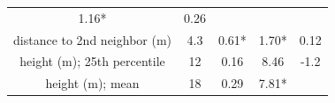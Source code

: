 \documentclass[]{article}
\begin{document}
\begin{longtable}[]{@{}ccccc@{}}
\begin{minipage}[t]{0.08\columnwidth}
1.16*\strut
\end{minipage} & \begin{minipage}[t]{0.13\columnwidth}\centering\strut
0.26\strut
\end{minipage}\tabularnewline
\begin{minipage}[t]{0.28\columnwidth}\centering\strut
distance to 2nd neighbor (m)\strut
\end{minipage} & \begin{minipage}[t]{0.13\columnwidth}\centering\strut
4.3\strut
\end{minipage} & \begin{minipage}[t]{0.24\columnwidth}\centering\strut
0.61*\strut
\end{minipage} & \begin{minipage}[t]{0.08\columnwidth}\centering\strut
1.70*\strut
\end{minipage} & \begin{minipage}[t]{0.13\columnwidth}\centering\strut
0.12\strut
\end{minipage}\tabularnewline
\begin{minipage}[t]{0.28\columnwidth}\centering\strut
height (m); 25th percentile\strut
\end{minipage} & \begin{minipage}[t]{0.13\columnwidth}\centering\strut
12\strut
\end{minipage} & \begin{minipage}[t]{0.24\columnwidth}\centering\strut
0.16\strut
\end{minipage} & \begin{minipage}[t]{0.08\columnwidth}\centering\strut
8.46\strut
\end{minipage} & \begin{minipage}[t]{0.13\columnwidth}\centering\strut
-1.2\strut
\end{minipage}\tabularnewline
\begin{minipage}[t]{0.28\columnwidth}\centering\strut
height (m); mean\strut
\end{minipage} & \begin{minipage}[t]{0.13\columnwidth}\centering\strut
18\strut
\end{minipage} & \begin{minipage}[t]{0.24\columnwidth}\centering\strut
0.29\strut
\end{minipage} & \begin{minipage}[t]{0.08\columnwidth}\centering\strut
7.81*\strut
\end{minipage} & \begin{minipage}[t]{0.13\columnwidth}\centering\strut

\end{minipage}
\end{longtable}
\end{document}

